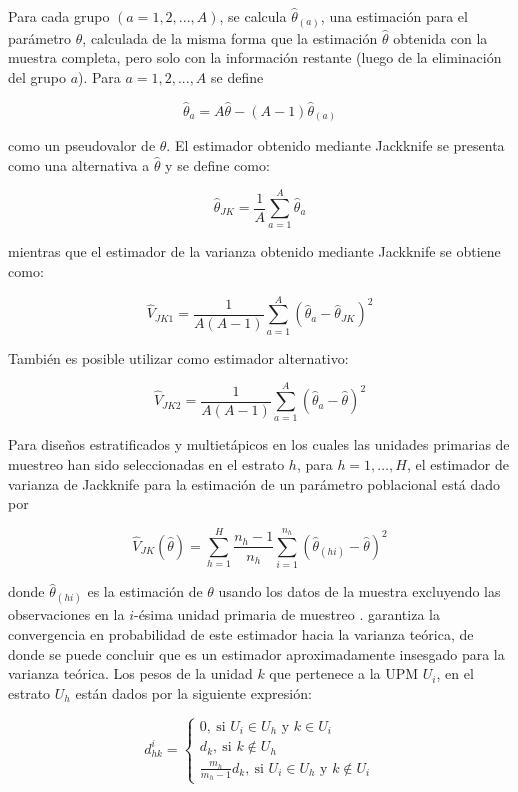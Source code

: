 \documentclass[
  10pt,
  spanish,
]{book}
\begin{document}
Para cada grupo \((a=1,2,...,A)\), se calcula \(\hat{\theta}_{(a)}\), una estimación para el parámetro \(\theta\), calculada de la misma forma que la estimación \(\hat{\theta}\) obtenida con la muestra completa, pero solo con la información restante (luego de la eliminación del grupo \(a\)). Para \(a=1,2,...,A\) se define

\[\hat{\theta}_{a}=A\hat{\theta}-(A-1)\hat{\theta}_{(a)}\]

como un pseudovalor de \(\theta\). El estimador obtenido mediante Jackknife se presenta como una alternativa a \(\hat{\theta}\) y se define como:

\[\hat{\theta}_{JK}=\dfrac{1}{A}\sum_{a=1}^{A}\hat{\theta}_{a}\]

mientras que el estimador de la varianza obtenido mediante Jackknife se obtiene como:

\[\hat{V}_{JK1}=\dfrac{1}{A(A-1)}\sum_{a=1}^{A}\left(\hat{\theta}_{a}-\hat{\theta}_{JK}\right)^{2}\]

También es posible utilizar como estimador alternativo:

\[\hat{V}_{JK2}=\dfrac{1}{A(A-1)}\sum_{a=1}^{A}\left(\hat{\theta}_{a}-\hat{\theta}\right)^{2}\]

Para diseños estratificados y multietápicos en los cuales las unidades primarias de muestreo han sido seleccionadas en el estrato \(h\), para \(h=1, \ldots, H\), el estimador de varianza de Jackknife para la estimación de un parámetro poblacional está dado por

\[ \hat{V}_{JK}(\hat{\theta}) = \sum_{h=1}^H \frac{n_h - 1}{n_h} \sum_{i=1}^{n_h}
(\hat{\theta}_{(hi)}-\hat{\theta})^2\]

donde \(\hat{\theta}_{(hi)}\) es la estimación de \(\theta\) usando los datos de la muestra excluyendo las observaciones en la \(i\)-ésima unidad primaria de muestreo \citep[pg. 29 -- 30]{Korn_Graubard_1999}. \citet[Teorema 6.2]{shao2012jackknife} garantiza la convergencia en probabilidad de este estimador hacia la varianza teórica, de donde se puede concluir que es un estimador aproximadamente insesgado para la varianza teórica. Los pesos de la unidad \(k\) que pertenece a la UPM \(U_i\), en el estrato \(U_h\) están dados por la siguiente expresión:

\[
d_{hk}^i = 
\begin{cases}
0, \ \text{si $U_i \in U_h$ y $k \in U_i$ }\\
d_k, \ \text{si $k \notin U_h$}\\
\frac{m_h}{m_h-1}d_k, \ \text{si $U_i \in U_h$ y $k \notin U_i$}
\end{cases}
\]
\end{document}
